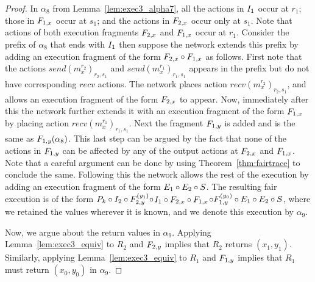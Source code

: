\begin{proof}
In $\alpha_8$ from Lemma~\ref{lem:exec3_alpha7}, all the actions in  
 $ \fragn{I_1}{\alpha_8}{}$  occur at $r_1$; those in   $ \fragn{F_{1,x}}{\alpha_8}{x_1}$  occur at $s_1$; and  the  
actions in $ \fragn{F_{2,x}}{\alpha_8}{y_1}$ occur only  at $s_1$. 
%
Note that actions of  both execution fragments $ \fragt{F_{2,x}}{\alpha_8}{}$  and   
$\fragt{F_{1,x}}{\alpha_8}{}$ occur at $r_1$.  
Consider the prefix of $\alpha_8$ that ends with $\fragt{I_1}{}{}$ then suppose the network  extends this prefix by adding an execution fragment of the form
$ \fragt{F_{2,x}}{\alpha_8}{} \circ  \fragt{F_{1,x}}{\alpha_8}{}$ as follows.  
%
First note that  the actions $send(m_x^{r_2})_{r_2, s_1}$ and 
 $send(m_x^{r_1})_{r_1, s_1}$ appears in the prefix but do not have corresponding $recv$ actions.
The  network places action $recv(m_x^{r_2})_{r_2, s_1}$, and allows an execution fragment of the form 
$ \fragt{F_{2,x}}{\alpha_8}{}$ to appear. Now, immediately after this the network further extends it with 
an execution fragment of the form  $\fragt{F_{1,x}}{\alpha_8}{}$  by placing action $recv(m_x^{r_1})_{r_1, s_1}$. 
 Next the fragment $\fragn{F_{1,y}}{\alpha_8}{y_0}$ is added  and is the same as $ \frage{F_{1,y}}{\alpha_8}{}$.
This last step can be argued by the fact that none of the actions in  $ \fragn{F_{1,y}}{\alpha_8}{y_0}$ can be affected by 
any of the output actions at $ \fragt{F_{2,x}}{\alpha_8}{}$ and  $\fragt{F_{1,x}}{\alpha_8}{}$. Note that a careful argument can be done by using Theorem~\ref{thm:fairtrace} to conclude the same. Following this the network allows the rest of the execution by adding an execution fragment of the form $\fragn{E_1}{\alpha_8}{x_0, y_0}
\circ \fragn{E_2}{\alpha_8}{x_1, y_1}\circ \fragn{S}{\alpha_8}{}$. The resulting fair execution is of the form 
$\finiteprefixA{k-1}{k}  \circ  \fragt{I_2}{\alpha_8}{} \circ \fragt{F_{2,y}}{\alpha_8}{y_1} \circ 
$$\fragt{I_1}{\alpha_8}{} \circ \fragn{F_{2,x}}{\alpha_8}{x_1} 
\circ  \fragn{F_{1,x}}{\alpha_8}{x_0} 
$$ \circ \fragt{F_{1,y}}{\alpha_8}{y_0} \circ \fragn{E_1}{\alpha_8}{x_0, y_0}
\circ \fragn{E_2}{\alpha_8}{x_1, y_1}\circ \fragt{S}{\alpha_8}{}$, where we retained the values wherever it is known, and we denote this  execution by $\alpha_9$.

Now, we argue about the return values in $\alpha_9$. 
Applying Lemma~\ref{lem:exec3_equiv} to $R_2$ and $\fragn{F_{2,y}}{\alpha_8}{y_1}$ implies that $R_2$ 
returns $(x_1, y_1 )$. Similarly, 
applying Lemma~\ref{lem:exec3_equiv} to $R_1$ and $\fragn{F_{1,y}}{\alpha_8}{y_0}$ implies that $R_1$ 
must return $(x_0, y_0 )$ in $\alpha_9$.
\end{proof}

